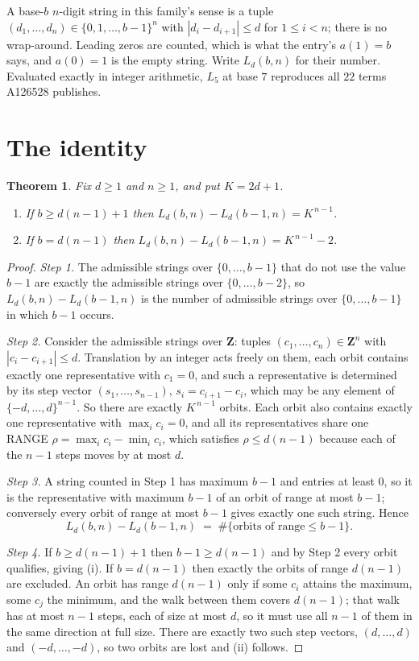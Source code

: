 \documentclass[11pt,a4paper]{article}
\theoremstyle{plain}
\newtheorem{theorem}{Theorem}
\theoremstyle{definition}
\begin{document}
A base-$b$ $n$-digit string in this family's sense is a tuple
$(d_1,\dots,d_n)\in\{0,1,\dots,b-1\}^{n}$ with $|d_i-d_{i+1}|\le d$ for $1\le i<n$; there
is no wrap-around. Leading zeros are counted, which is what the entry's $a(1)=b$ says, and
$a(0)=1$ is the empty string. Write $L_d(b,n)$ for their number. Evaluated exactly in integer
arithmetic, $L_{5}$ at base $7$ reproduces all $22$ terms A126528 publishes.

\section{The identity}

\begin{theorem}
Fix $d\ge1$ and $n\ge1$, and put $K=2d+1$.
\begin{enumerate}
\item[(i)] If $b\ge d(n-1)+1$ then $L_d(b,n)-L_d(b-1,n)=K^{\,n-1}$.
\item[(ii)] If $b=d(n-1)$ then $L_d(b,n)-L_d(b-1,n)=K^{\,n-1}-2$.
\end{enumerate}
\end{theorem}

\begin{proof}
\emph{Step 1.} The admissible strings over $\{0,\dots,b-1\}$ that do not use the value $b-1$
are exactly the admissible strings over $\{0,\dots,b-2\}$, so $L_d(b,n)-L_d(b-1,n)$ is the
number of admissible strings over $\{0,\dots,b-1\}$ in which $b-1$ occurs.

\emph{Step 2.} Consider the admissible strings over $\mathbf{Z}$: tuples
$(c_1,\dots,c_n)\in\mathbf{Z}^{n}$ with $|c_i-c_{i+1}|\le d$. Translation by an integer acts
freely on them, each orbit contains exactly one representative with $c_1=0$, and such a
representative is determined by its step vector $(s_1,\dots,s_{n-1})$, $s_i=c_{i+1}-c_i$,
which may be any element of $\{-d,\dots,d\}^{n-1}$. So there are exactly $K^{\,n-1}$ orbits.
Each orbit also contains exactly one representative with $\max_i c_i=0$, and all its
representatives share one RANGE $\rho=\max_ic_i-\min_ic_i$, which satisfies
$\rho\le d(n-1)$ because each of the $n-1$ steps moves by at most $d$.

\emph{Step 3.} A string counted in Step 1 has maximum $b-1$ and entries at least $0$, so it is
the representative with maximum $b-1$ of an orbit of range at most $b-1$; conversely every orbit
of range at most $b-1$ gives exactly one such string. Hence
\[
L_d(b,n)-L_d(b-1,n)\;=\;\#\{\text{orbits of range}\le b-1\} .
\]

\emph{Step 4.} If $b\ge d(n-1)+1$ then $b-1\ge d(n-1)$ and by Step 2 every orbit qualifies,
giving (i). If $b=d(n-1)$ then exactly the orbits of range $d(n-1)$ are excluded. An orbit has
range $d(n-1)$ only if some $c_i$ attains the maximum, some $c_j$ the minimum, and the walk
between them covers $d(n-1)$; that walk has at most $n-1$ steps, each of size at most $d$, so it
must use all $n-1$ of them in the same direction at full size. There are exactly two such step
vectors, $(d,\dots,d)$ and $(-d,\dots,-d)$, so two orbits are lost and (ii) follows.
\end{proof}
\end{document}
